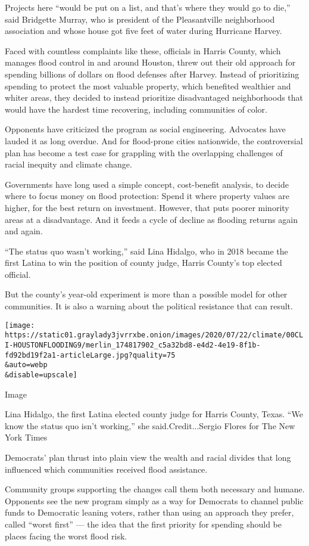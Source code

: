 Projects here ``would be put on a list, and that's where they would go
to die,'' said Bridgette Murray, who is president of the Pleasantville
neighborhood association and whose house got five feet of water during
Hurricane Harvey.

Faced with countless complaints like these, officials in Harris County,
which manages flood control in and around Houston, threw out their old
approach for spending billions of dollars on flood defenses after
Harvey. Instead of prioritizing spending to protect the most valuable
property, which benefited wealthier and whiter areas, they decided to
instead prioritize disadvantaged neighborhoods that would have the
hardest time recovering, including communities of color.

Opponents have criticized the program as social engineering. Advocates
have lauded it as long overdue. And for flood-prone cities nationwide,
the controversial plan has become a test case for grappling with the
overlapping challenges of racial inequity and climate change.

Governments have long used a simple concept, cost-benefit analysis, to
decide where to focus money on flood protection: Spend it where property
values are higher, for the best return on investment. However, that puts
poorer minority areas at a disadvantage. And it feeds a cycle of decline
as flooding returns again and again.

``The status quo wasn't working,'' said Lina Hidalgo, who in 2018 became
the first Latina to win the position of county judge, Harris County's
top elected official.

But the county's year-old experiment is more than a possible model for
other communities. It is also a warning about the political resistance
that can result.

\texttt{[image: https://static01.graylady3jvrrxbe.onion/images/2020/07/22/climate/00CLI-HOUSTONFLOODING9/merlin\_174817902\_c5a32bd8-e4d2-4e19-8f1b-fd92bd19f2a1-articleLarge.jpg?quality=75\\\&auto=webp\\\&disable=upscale]}

Image

Lina Hidalgo, the first Latina elected county judge for Harris County,
Texas. ``We know the status quo isn't working,'' she
said.Credit...Sergio Flores for The New York Times

Democrats' plan thrust into plain view the wealth and racial divides
that long influenced which communities received flood assistance.

Community groups supporting the changes call them both necessary and
humane. Opponents see the new program simply as a way for Democrats to
channel public funds to Democratic leaning voters, rather than using an
approach they prefer, called ``worst first'' --- the idea that the first
priority for spending should be places facing the worst flood risk.


